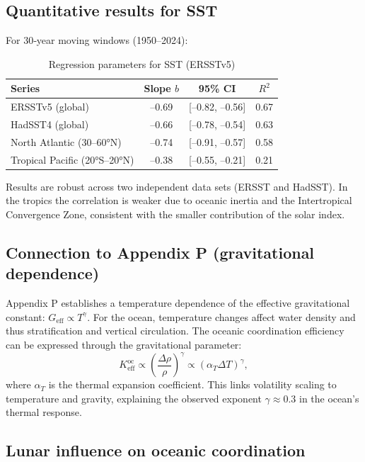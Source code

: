 \documentclass[12pt,a4paper]{article}
\newcommand{\Keff}{K_{\mathrm{eff}}}
\newcommand{\ga}{\gamma}
\begin{document}
	\subsection{Quantitative results for SST}
	
	For 30‑year moving windows (1950–2024):
	
	\begin{table}[htbp]
		\centering
		\caption{Regression parameters for SST (ERSSTv5)}
		\label{tab:sst_reg}
		\begin{tabular}{@{}lccc@{}}
			\toprule
			Series & Slope \(b\) & 95\% CI & \(R^2\) \\
			\midrule
			ERSSTv5 (global) & –0.69 & [–0.82, –0.56] & 0.67 \\
			HadSST4 (global)  & –0.66 & [–0.78, –0.54] & 0.63 \\
			North Atlantic (30–60°N) & –0.74 & [–0.91, –0.57] & 0.58 \\
			Tropical Pacific (20°S–20°N) & –0.38 & [–0.55, –0.21] & 0.21 \\
			\bottomrule
		\end{tabular}
	\end{table}
	
	Results are robust across two independent data sets (ERSST and HadSST). In the tropics the correlation is weaker due to oceanic inertia and the Intertropical Convergence Zone, consistent with the smaller contribution of the solar index.
	
	\subsection{Connection to Appendix P (gravitational dependence)}
	
	Appendix P establishes a temperature dependence of the effective gravitational constant: \(G_{\text{eff}} \propto T^{\ga}\). For the ocean, temperature changes affect water density and thus stratification and vertical circulation. The oceanic coordination efficiency can be expressed through the gravitational parameter:
	\[
	\Keff^{\text{oc}} \propto \left( \frac{\Delta \rho}{\rho} \right)^{\ga} \propto (\alpha_T \Delta T)^{\ga},
	\]
	where \(\alpha_T\) is the thermal expansion coefficient. This links volatility scaling to temperature and gravity, explaining the observed exponent \(\ga \approx 0.3\) in the ocean's thermal response.
	
	\subsection{Lunar influence on oceanic coordination}
	
\end{document}

